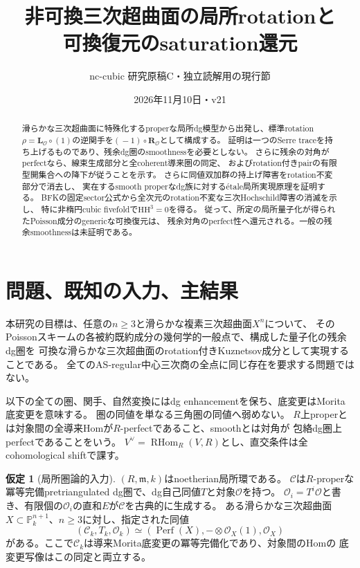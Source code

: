 \documentclass[a4paper,10pt]{ltjsarticle}
\title{非可換三次超曲面の局所rotationと\protect\\可換復元のsaturation還元}
\author{nc-cubic 研究原稿C・独立読解用の現行節}
\date{2026年11月10日・v21}
\theoremstyle{definition}
\newtheorem{hypothesis}[theorem]{仮定}
\theoremstyle{remark}
\newcommand{\Perf}{\operatorname{Perf}}
\newcommand{\RHom}{\operatorname{RHom}}
\newcommand{\OO}{\mathcal O}
\newcommand{\cC}{\mathcal C}
\newcommand{\LL}{\mathbf L}
\newcommand{\RR}{\mathbf R}
\begin{document}
\maketitle
\begin{abstract}
滑らかな三次超曲面に特殊化するproperな局所dg模型から出発し、標準rotation
$\rho=\LL_{\OO}\circ(1)$の逆関手を$(\!-1)\circ\RR_{\OO}$として構成する。
証明は一つのSerre traceを持ち上げるものであり、残余dg圏のsmoothnessを必要としない。
さらに残余の対角がperfectなら、線束生成部分と全coherent導来圏の同定、
およびrotation付きpairの有限型開集合への降下が従うことを示す。
さらに同値双加群の持上げ障害をrotation不変部分で消去し、
実在するsmooth properなdg族に対するétale局所実現原理を証明する。
BFKの固定sector公式から全次元のrotation不変な三次Hochschild障害の消滅を示し、
特に非楕円cubic fivefoldで\(\mathrm{HH}^3=0\)を得る。
従って、所定の局所量子化が得られたPoisson成分のgenericな可換復元は、
残余対角のperfect性へ還元される。一般の残余smoothnessは未証明である。
\end{abstract}
\tableofcontents

\section{問題、既知の入力、主結果}\label{sec:intro}
本研究の目標は、任意の$n\ge3$と滑らかな複素三次超曲面$X^n$について、
そのPoissonスキームの各被約既約成分の幾何学的一般点で、構成した量子化の残余dg圏を
可換な滑らかな三次超曲面のrotation付きKuznetsov成分として実現することである。
全てのAS-regular中心三次商の全点に同じ存在を要求する問題ではない。

以下の全ての圏、関手、自然変換にはdg enhancementを保ち、底変更はMorita底変更を意味する。
圏の同値を単なる三角圏の同値へ弱めない。
$R$上properとは対象間の全導来Homが$R$-perfectであること、smoothとは対角が
包絡dg圏上perfectであることをいう。
$V^\vee=\RHom_R(V,R)$とし、直交条件は全cohomological shiftで課す。

\begin{hypothesis}[局所圏論的入力]\label{hyp:categorical}
$(R,\mathfrak m,k)$はnoetherian局所環である。
$\cC$は$R$-properな冪等完備pretriangulated dg圏で、dg自己同値$T$と対象$\OO$を持つ。
$\OO_i=T^i\OO$と書き、有限個の$\OO_i$の直和$E$が$\cC$を古典的に生成する。
ある滑らかな三次超曲面$X\subset\mathbb P^{n+1}_k$、$n\ge3$に対し、指定された同値
\[
 (\cC_k,T_k,\OO_k)\simeq(\Perf(X),-\otimes\OO_X(1),\OO_X)
 \tag{L}\label{eq:local-input}
\]
がある。ここで$\cC_k$は導来Morita底変更の冪等完備化であり、対象間のHomの
底変更写像はこの同定と両立する。
\end{hypothesis}
\end{document}
